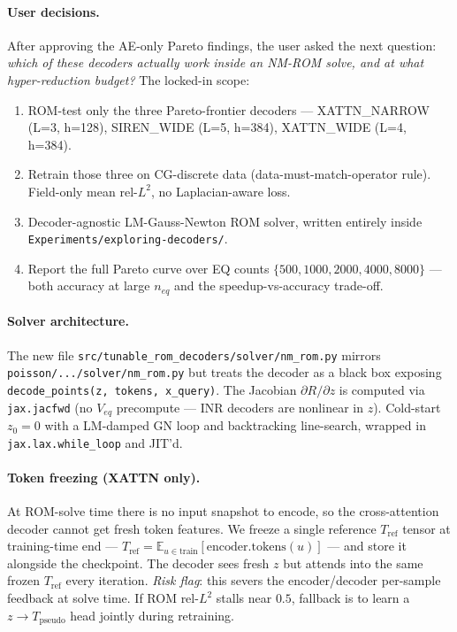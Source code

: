 \documentclass[11pt]{article}
\begin{document}
\paragraph{User decisions.}
After approving the AE-only Pareto findings, the user asked the next
question: \emph{which of these decoders actually work inside an NM-ROM
solve, and at what hyper-reduction budget?} The locked-in scope:
\begin{enumerate}
\item ROM-test only the three Pareto-frontier decoders ---
      XATTN\_NARROW (L=3, h=128), SIREN\_WIDE (L=5, h=384), XATTN\_WIDE
      (L=4, h=384).
\item Retrain those three on CG-discrete data (data-must-match-operator
      rule). Field-only mean rel-$L^2$, no Laplacian-aware loss.
\item Decoder-agnostic LM-Gauss-Newton ROM solver, written entirely
      inside \texttt{Experiments/exploring-decoders/}.
\item Report the full Pareto curve over EQ counts
      $\{500, 1000, 2000, 4000, 8000\}$ --- both accuracy at large
      $n_{eq}$ and the speedup-vs-accuracy trade-off.
\end{enumerate}

\paragraph{Solver architecture.}
The new file \texttt{src/tunable\_rom\_decoders/solver/nm\_rom.py}
mirrors \texttt{poisson/.../solver/nm\_rom.py} but treats the decoder
as a black box exposing \texttt{decode\_points(z, tokens, x\_query)}.
The Jacobian $\partial R / \partial z$ is computed via
\texttt{jax.jacfwd} (no $V_{eq}$ precompute --- INR decoders are
nonlinear in $z$). Cold-start $z_0 = 0$ with a LM-damped GN loop and
backtracking line-search, wrapped in \texttt{jax.lax.while\_loop} and
JIT'd.

\paragraph{Token freezing (XATTN only).}
At ROM-solve time there is no input snapshot to encode, so the
cross-attention decoder cannot get fresh token features. We freeze a
single reference $T_{\text{ref}}$ tensor at training-time end ---
$T_{\text{ref}} = \mathbb{E}_{u \in \text{train}}[\text{encoder.tokens}(u)]$ ---
and store it alongside the checkpoint. The decoder sees fresh $z$ but
attends into the same frozen $T_{\text{ref}}$ every iteration.
\emph{Risk flag}: this severs the encoder/decoder per-sample feedback
at solve time. If ROM rel-$L^2$ stalls near $0.5$, fallback is to
learn a $z \to T_{\text{pseudo}}$ head jointly during retraining.
\end{document}

